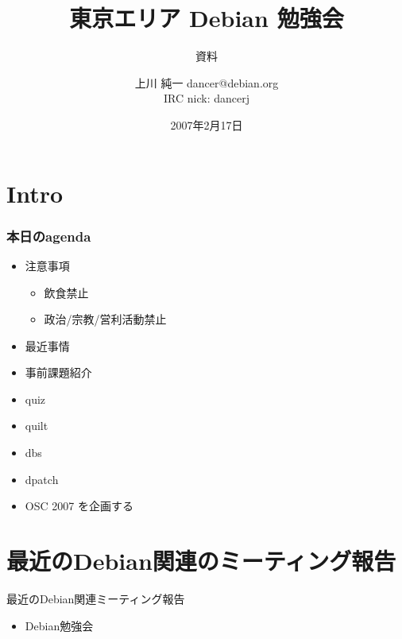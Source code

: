 \documentclass[cjk,dvipdfmx]{beamer}
\title{東京エリア Debian 勉強会}
\subtitle{資料}
\author{上川 純一 dancer@debian.org\\IRC nick: dancerj}
\date{2007年2月17日}
\begin{document}
\frame{\titlepage{}}

\section{Intro}

\begin{frame}
 \frametitle{本日のagenda}
\begin{minipage}[t]{0.4\hsize}
  \begin{itemize}
  \item 注意事項
	\begin{itemize}
	 \item 飲食禁止
	 \item 政治/宗教/営利活動禁止
	\end{itemize}
  \item 最近事情
  \item 事前課題紹介
  \item quiz
 \end{itemize}
\end{minipage} 
\begin{minipage}[t]{0.4\hsize}
 \begin{itemize}
  \item quilt
  \item dbs 
  \item dpatch 
  \item OSC 2007 を企画する
 \end{itemize}
\end{minipage}
\end{frame}

\section{最近のDebian関連のミーティング報告}

\begin{frame}{最近のDebian関連ミーティング報告}
 \begin{itemize}
  \item Debian勉強会
 \end{itemize}
\end{frame}
\end{document}
